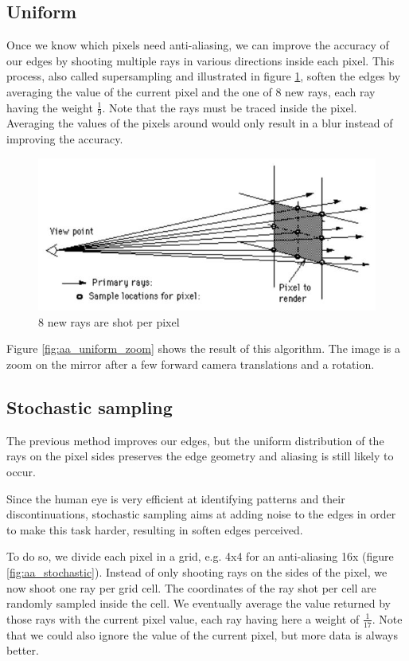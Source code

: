 \subsection{Uniform}
Once we know which pixels need anti-aliasing, we can improve the accuracy of our edges by shooting multiple rays in various directions inside each pixel. This process, also called supersampling and illustrated in figure \ref{fig:aa_uniform}, soften the edges by averaging the value of the current pixel and the one of 8 new rays, each ray having the weight $\frac{1}{9}$. Note that the rays must be traced inside the pixel. Averaging the values of the pixels around would only result in a blur instead of improving the accuracy.

\begin{figure}[H]
\centering
\includegraphics[width=0.35\linewidth]{img/antialiasing/uniform.jpg}
\caption{8 new rays are shot per pixel}
\label{fig:aa_uniform}
\end{figure}

Figure \ref{fig:aa_uniform_zoom} shows the result of this algorithm. The image is a zoom on the mirror after a few forward camera translations and a rotation.

\subsection{Stochastic sampling}
The previous method improves our edges, but the uniform distribution of the rays on the pixel sides preserves the edge geometry and aliasing is still likely to occur.

Since the human eye is very efficient at identifying patterns and their discontinuations, stochastic sampling aims at adding noise to the edges in order to make this task harder, resulting in soften edges perceived. 

To do so, we divide each pixel in a grid, e.g. 4x4 for an anti-aliasing 16x (figure \ref{fig:aa_stochastic}). Instead of only shooting rays on the sides of the pixel, we now shoot one ray per grid cell. The coordinates of the ray shot per cell are randomly sampled inside the cell. We eventually average the value returned by those rays with the current pixel value, each ray having here a weight of $\frac{1}{17}$. Note that we could also ignore the value of the current pixel, but more data is always better.

